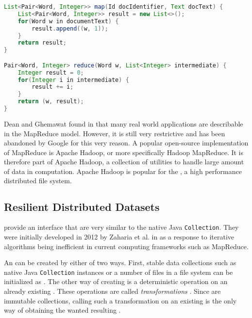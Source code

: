 \begin{lstlisting}[language=Java,caption={Example pseudocode implementation of the MapReduce model to count word occurrences.},label=lst:mapreduce,float]
List<Pair<Word, Integer>> map(Id docIdentifier, Text docText) {
	List<Pair<Word, Integer>> result = new List<>();
	for(Word w in documentText) {
		result.append((w, 1));
	}
	return result;
}

Pair<Word, Integer> reduce(Word w, List<Integer> intermediate) {
	Integer result = 0;
	for(Integer i in intermediate) {
		result += i;
	}
	return (w, result);
}

\end{lstlisting}
	
Dean and Ghemawat found in \cite{dean2008mapreduce} that many real world applications are describable in the MapReduce model. However, it is still very restrictive and has been abandoned by Google for this very reason. A popular open-source implementation of MapReduce is Apache Hadoop, or more specifically Hadoop MapReduce. It is therefore part of Apache Hadoop, a collection of utilities to handle large amount of data in computation. Apache Hadoop is popular for the \hdfs{}, a high performance distributed file system.

\subsection{Resilient Distributed Datasets}
\label{ssec:rdds}

\rdds{} provide an interface that are very similar to the native Java \lstinline|Collection|. They were initially developed in 2012 by Zaharia et al. in \cite{zaharia2012resilient} as a response to iterative algorithms being inefficient in current computing frameworks such as MapReduce.

An \rdd{} can be created by either of two ways. First, stable data collections such as native Java \lstinline|Collection| instances or a number of files in a file system can be initialized as \rdds{}. The other way of creating is a deterministic operation on an already existing \rdd{}. These operations are called \emph{transformations} \cite{zaharia2012resilient}. Since \rdds{} are immutable collections, calling such a transformation on an existing \rdd{} is the only way of obtaining the wanted resulting \rdd{}.

